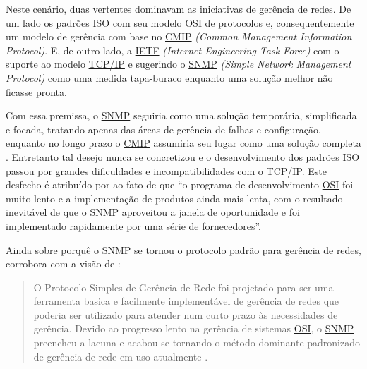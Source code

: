 \documentclass[twoside,english,brazilian]{UNISINOSmonografia}
\begin{document}
Neste cenário, duas vertentes dominavam as iniciativas de gerência de redes. 
De um lado os padrões \hyperref[siglas]{ISO} com seu modelo \hyperref[siglas]{OSI} de protocolos e, consequentemente 
um modelo de gerência com base no \hyperref[siglas]{CMIP} \textit{(Common Management Information 
Protocol)}.
E, de outro lado, a \hyperref[siglas]{IETF} \textit{(Internet Engineering Task Force)} com o 
suporte ao modelo \hyperref[siglas]{TCP/IP} e sugerindo o \hyperref[siglas]{SNMP} 
\textit{(Simple Network Management Protocol)} 
como uma medida tapa-buraco enquanto uma solução melhor não ficasse pronta.

Com essa premissa, o \hyperref[siglas]{SNMP} seguiria como uma solução temporária, simplificada e 
focada, tratando apenas das áreas de gerência de falhas e configuração, 
enquanto no longo prazo o \hyperref[siglas]{CMIP} assumiria seu lugar como uma solução completa 
\cite{Leinwand1996,stallings1999snmp}. 
Entretanto tal desejo nunca se concretizou e o desenvolvimento dos padrões \hyperref[siglas]{ISO} 
passou por grandes dificuldades e incompatibilidades com o \hyperref[siglas]{TCP/IP}.
Este desfecho é atribuído por  ao fato de que 
``o programa de 
desenvolvimento \hyperref[siglas]{OSI} foi muito lento e a implementação de produtos ainda mais 
lenta, com o resultado inevitável de que o \hyperref[siglas]{SNMP} aproveitou a janela de 
oportunidade e foi implementado rapidamente por uma série de fornecedores''.

Ainda sobre porquê o \hyperref[siglas]{SNMP} se tornou o protocolo padrão para gerência de redes, 
 corrobora com a visão de :

\begin{quote}
O Protocolo Simples de Gerência de Rede foi projetado para ser uma ferramenta 
basica e facilmente implementável de gerência de redes que poderia ser 
utilizado para atender num curto prazo às necessidades de gerência. Devido ao 
progresso lento na gerência de sistemas \hyperref[siglas]{OSI}, o \hyperref[siglas]{SNMP} preencheu a lacuna e 
acabou se tornando o método dominante padronizado de gerência de rede em uso 
atualmente
\cite[p.~83]{stallings1999snmp}.
\end{quote}
\end{document}
